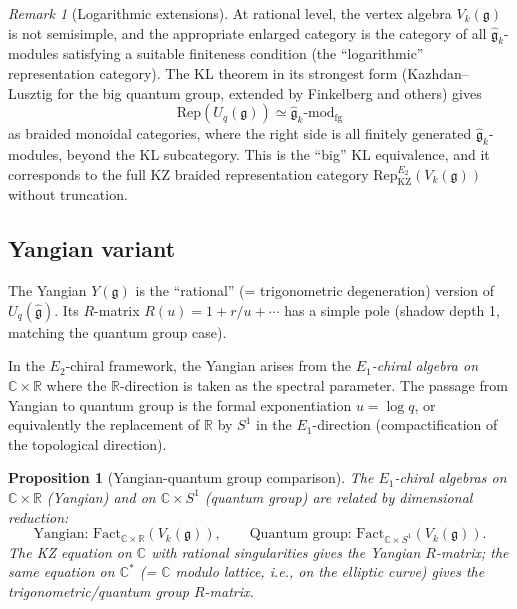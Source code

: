 \documentclass[11pt]{article}
\newtheorem{proposition}[theorem]{Proposition}
\theoremstyle{definition}
\theoremstyle{remark}
\newtheorem{remark}[theorem]{Remark}
\newcommand{\Rep}{\mathrm{Rep}}
\newcommand{\Fact}{\mathrm{Fact}}
\newcommand{\Uq}{U_q}
\newcommand{\frakg}{\mathfrak{g}}
\newcommand{\KZ}{\mathrm{KZ}}
\begin{document}
\begin{remark}[Logarithmic extensions]
\label{rem:logarithmic}
At rational level, the vertex algebra $V_k(\frakg)$ is not semisimple,
and the appropriate enlarged category is the category of all
$\hat{\frakg}_k$-modules satisfying a suitable finiteness condition
(the ``logarithmic'' representation category). The KL theorem in its
strongest form (Kazhdan--Lusztig for the big quantum group, extended
by Finkelberg and others) gives
\[
 \Rep(\Uq(\frakg)) \simeq \hat{\frakg}_k\text{-}\mathrm{mod}_{\mathrm{fg}}
\]
as braided monoidal categories, where the right side is all finitely
generated $\hat{\frakg}_k$-modules, beyond the KL subcategory.
	This is the ``big'' KL equivalence, and it corresponds to the full
	KZ braided representation category
	$\Rep^{E_2}_{\KZ}(V_k(\frakg))$ without truncation.
\end{remark}

\subsection{Yangian variant}
\label{subsec:yangian}

The Yangian $Y(\frakg)$ is the ``rational'' (= trigonometric degeneration)
version of $\Uq(\hat{\frakg})$. Its $R$-matrix $R(u) = 1 + r/u + \cdots$
has a simple pole (shadow depth 1, matching the quantum group case).

In the $E_2$-chiral framework, the Yangian arises from the
\emph{$E_1$-chiral algebra on $\mathbb{C} \times \mathbb{R}$} where
the $\mathbb{R}$-direction is taken as the spectral parameter. The
passage from Yangian to quantum group is the formal exponentiation
$u = \log q$, or equivalently the replacement of $\mathbb{R}$ by
$S^1$ in the $E_1$-direction (compactification of the topological
direction).

\begin{proposition}[Yangian-quantum group comparison]
\label{prop:yangian-qg}
The $E_1$-chiral algebras on $\mathbb{C} \times \mathbb{R}$ (Yangian)
and on $\mathbb{C} \times S^1$ (quantum group) are related by dimensional
reduction:
\[
 \text{Yangian: } \Fact_{\mathbb{C} \times \mathbb{R}}(V_k(\frakg)),
 \qquad
 \text{Quantum group: } \Fact_{\mathbb{C} \times S^1}(V_k(\frakg)).
\]
The KZ equation on $\mathbb{C}$ with rational singularities gives the
Yangian $R$-matrix; the same equation on $\mathbb{C}^*$ (= $\mathbb{C}$ modulo
lattice, i.e., on the elliptic curve) gives the trigonometric/quantum
group $R$-matrix.
\end{proposition}
\end{document}

